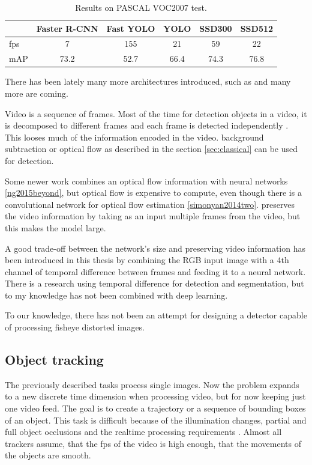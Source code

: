 \documentclass[a4paper,12pt,titlepage, twoside]{article}
\numberwithin{figure}{section}
\begin{document}
\begin{table}
\centering
\begin{tabular}{|l|c|c|c|c|c|}
  \hline
  &Faster R-CNN & Fast YOLO & YOLO & SSD300 & SSD512 \\
  \hline
  fps & 7 & 155 & 21 & 59 & 22\\
  \hline
  mAP & 73.2 & 52.7 & 66.4 & 74.3 & 76.8\\
  \hline
\end{tabular}
\caption{Results on PASCAL VOC2007 test.}
\end{table}

There has been lately many more architectures introduced, such as \cite{lin2017focal, li2017fssd, dai2016r} and many more are coming.

Video is a sequence of frames. Most of the time for detection objects in a video, it is decomposed to different frames  and each frame is detected independently \cite{sudowe2011efficient}. This looses much of the information  encoded in the video. background subtraction \cite{gonzalez2012digital} or optical flow \cite{naoya1990optical} as described in the section \ref{sec:classical} can be used for detection. 

Some newer work combines an optical flow information with neural networks \ref{ng2015beyond}, but optical flow is expensive to compute, even though there is a convolutional network for optical flow estimation \ref{simonyan2014two}. \cite{karpathy2014large} preserves the video information by taking as an input multiple frames from the video, but this makes the model large. 

A good trade-off between the network's size and preserving video information has been introduced in this thesis by combining the RGB input image with a 4th channel of temporal difference between frames and feeding it to a neural network. There is a research \cite{bayona2010stationary, koprinska2001temporal} using temporal difference for detection and segmentation, but to my knowledge has not been combined with deep learning.

To our knowledge, there has not been an attempt for designing a detector capable of processing fisheye distorted images. 

\subsection{Object tracking}

The previously described tasks process single images. Now the problem expands to a new discrete time dimension when processing video, but for now keeping just one video feed. The goal is to create a trajectory or a sequence of bounding boxes of an object. This task is difficult because of the illumination changes, partial and full object occlusions and the realtime processing requirements \cite{yilmaz2006object}. Almost all trackers assume, that the fps of the video is high enough, that the movements of the objects are smooth. 
\end{document}
